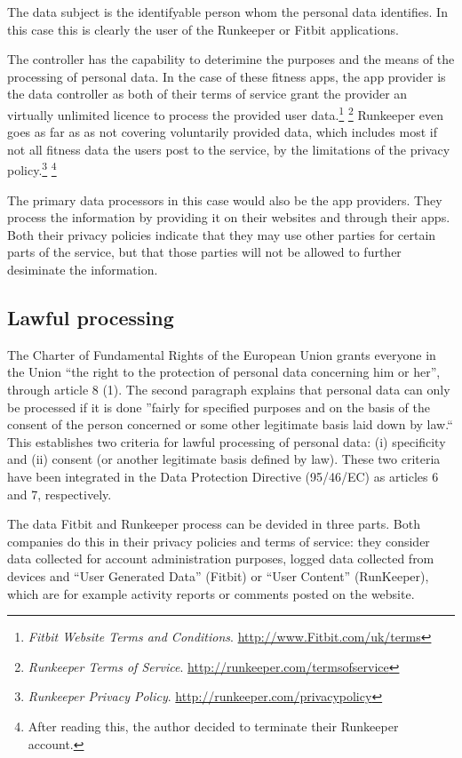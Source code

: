 \documentclass{article}
\begin{document}
The data subject is the identifyable person whom the personal data identifies.
In this case this is clearly the user of the Runkeeper or Fitbit applications.

The controller has the capability to deterimine the purposes and the means of the processing of personal data.
In the case of these fitness apps, the app provider is the data controller as both of their terms of service grant the provider an virtually unlimited licence to process the provided user data.\footnote{\emph{Fitbit Website Terms and Conditions}. \url{http://www.Fitbit.com/uk/terms}} \footnote{\emph{Runkeeper Terms of Service}. \url{http://runkeeper.com/termsofservice}}
Runkeeper even goes as far as as not covering voluntarily provided data, which includes most if not all fitness data the users post to the service, by the limitations of the privacy policy.\footnote{\emph{Runkeeper Privacy Policy}. \url{http://runkeeper.com/privacypolicy}} \footnote{After reading this, the author decided to terminate their Runkeeper account.}

The primary data processors in this case would also be the app providers.
They process the information by providing it on their websites and through their apps.
Both their privacy policies indicate that they may use other parties for certain parts of the service, but that those parties will not be allowed to further desiminate the information.

\subsection{Lawful processing}

The Charter of Fundamental Rights of the European Union grants everyone in the Union ``the right to the protection of personal data concerning him or her'', through article 8 (1).
The second paragraph explains that personal data can only be processed if it is done ''fairly for specified purposes and on the basis of the consent of the person concerned or some other legitimate basis laid down by law.``
This establishes two criteria for lawful processing of personal data: (i) specificity and (ii) consent (or another legitimate basis defined by law).
These two criteria have been integrated in the Data Protection Directive (95/46/EC) as articles 6 and 7, respectively.

The data Fitbit and Runkeeper process can be devided in three parts. Both companies do this in their privacy policies and terms of service: they consider data collected for account administration purposes, logged data collected from devices and ``User Generated Data'' (Fitbit) or ``User Content'' (RunKeeper), which are for example activity reports or comments posted on the website.
\end{document}
